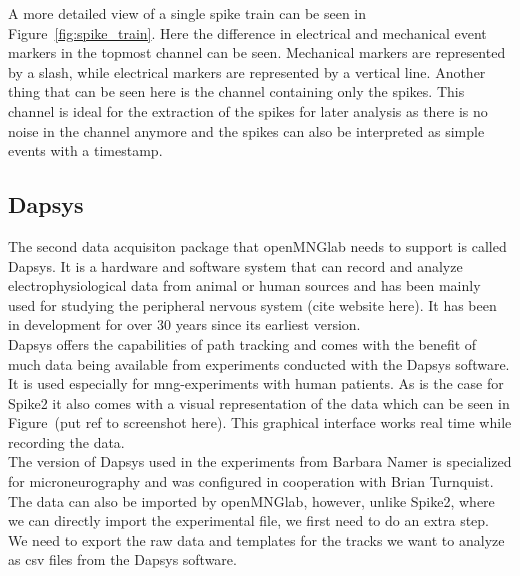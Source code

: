 A more detailed view of a single spike train can be seen in Figure~\ref{fig:spike_train}. Here the difference in electrical and mechanical event markers in the topmost channel can be seen. Mechanical markers are represented by a slash, while electrical markers are represented by a vertical line. Another thing that can be seen here is the channel containing only the spikes. This channel is ideal for the extraction of the spikes for later analysis as there is no noise in the channel anymore and the spikes can also be interpreted as simple events with a timestamp.

\subsection{Dapsys}

The second data acquisiton package that openMNGlab needs to support is called Dapsys. It is a hardware and software system that can record and analyze electrophysiological data from animal or human sources and has been mainly used for studying the peripheral nervous system (cite website here). It has been in development for over 30 years since its earliest version. \\
Dapsys offers the capabilities of path tracking and comes with the benefit of much data being available from experiments conducted with the Dapsys software. It is used especially for mng-experiments with human patients. As is the case for Spike2 it also comes with a visual representation of the data which can be seen in Figure~(put ref to screenshot here). This graphical interface works real time while recording the data.\\
The version of Dapsys used in the experiments from Barbara Namer is specialized for microneurography and was configured in cooperation with Brian Turnquist.\\
The data can also be imported by openMNGlab, however, unlike Spike2, where we can directly import the experimental file, we first need to do an extra step. We need to export the raw data and templates for the tracks we want to analyze as csv files from the Dapsys software.\\



